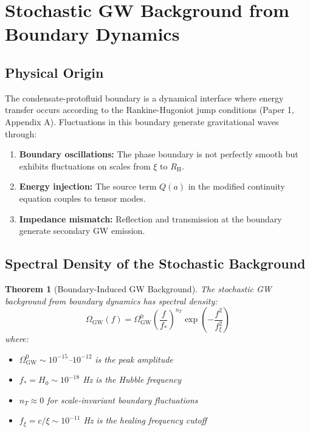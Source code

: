 \documentclass[11pt,a4paper]{article}
\newcommand{\RH}{\ensuremath{R_{\mathrm{H}}}}
\newtheorem{theorem}{Theorem}[section]
\theoremstyle{definition}
\theoremstyle{remark}
\begin{document}
\section{Stochastic GW Background from Boundary Dynamics}
\label{sec:stochastic_background}

\subsection{Physical Origin}
\label{sec:stochastic_origin}

The condensate-protofluid boundary is a dynamical interface where energy transfer occurs according to the Rankine-Hugoniot jump conditions (Paper 1, Appendix A). Fluctuations in this boundary generate gravitational waves through:

\begin{enumerate}[label=(\arabic*)]
\item \textbf{Boundary oscillations:} The phase boundary is not perfectly smooth but exhibits fluctuations on scales from $\xi$ to $\RH$.
\item \textbf{Energy injection:} The source term $Q(a)$ in the modified continuity equation couples to tensor modes.
\item \textbf{Impedance mismatch:} Reflection and transmission at the boundary generate secondary GW emission.
\end{enumerate}

\subsection{Spectral Density of the Stochastic Background}
\label{sec:spectral_density}

\begin{theorem}[Boundary-Induced GW Background]
\label{thm:stochastic_spectrum}
The stochastic GW background from boundary dynamics has spectral density:
\begin{equation}
\label{eq:omega_gw}
\boxed{\Omega_{\mathrm{GW}}(f) = \Omega_{\mathrm{GW}}^0 \left(\frac{f}{f_*}\right)^{n_T} \exp\left(-\frac{f^2}{f_{\xi}^2}\right)}
\end{equation}
where:
\begin{itemize}
\item $\Omega_{\mathrm{GW}}^0 \sim 10^{-15}$--$10^{-12}$ is the peak amplitude
\item $f_* = H_0 \sim 10^{-18}$ Hz is the Hubble frequency
\item $n_T \approx 0$ for scale-invariant boundary fluctuations
\item $f_\xi = c/\xi \sim 10^{-11}$ Hz is the healing frequency cutoff
\end{itemize}
\end{theorem}
\end{document}
